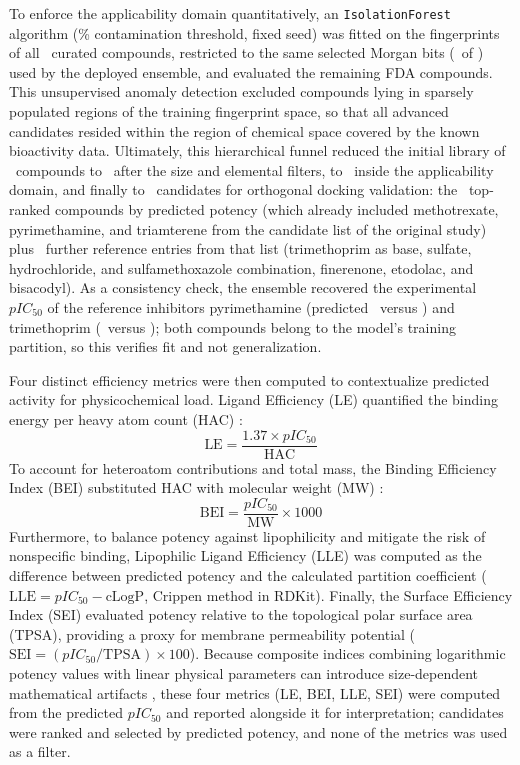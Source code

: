 To enforce the applicability domain quantitatively, an \texttt{IsolationForest} algorithm (\ScreenIsoContamination\% contamination threshold, fixed seed) was fitted on the fingerprints of all \ScreenNTrainMols\ curated compounds, restricted to the same selected Morgan bits (\ExpBNFeaturesSelected\ of \ExpBNFeaturesTotal) used by the deployed ensemble, and evaluated the remaining FDA compounds. This unsupervised anomaly detection excluded compounds lying in sparsely populated regions of the training fingerprint space, so that all advanced candidates resided within the region of chemical space covered by the known bioactivity data. Ultimately, this hierarchical funnel reduced the initial library of \ScreenNLibrary\ compounds to \ScreenNStructural\ after the size and elemental filters, to \ScreenNDomain\ inside the applicability domain, and finally to \ScreenNCandidates\ candidates for orthogonal docking validation: the \ScreenNTopML\ top-ranked compounds by predicted potency (which already included methotrexate, pyrimethamine, and triamterene from the candidate list of the original study) plus \ScreenNReference\ further reference entries from that list (trimethoprim as base, sulfate, hydrochloride, and sulfamethoxazole combination, finerenone, etodolac, and bisacodyl). As a consistency check, the ensemble recovered the experimental $pIC_{50}$ of the reference inhibitors pyrimethamine (predicted \ControlPyrimethaminePred\ versus \ControlPyrimethamineExp) and trimethoprim (\ControlTrimethoprimPred\ versus \ControlTrimethoprimExp); both compounds belong to the model's training partition, so this verifies fit and not generalization.

Four distinct efficiency metrics were then computed to contextualize predicted activity for physicochemical load. Ligand Efficiency (LE) quantified the binding energy per heavy atom count (HAC) \cite{hopkins2014}:
\begin{equation}
	\text{LE} = \frac{1.37 \times pIC_{50}}{\text{HAC}}
\end{equation}
To account for heteroatom contributions and total mass, the Binding Efficiency Index (BEI) substituted HAC with molecular weight (MW) \cite{abad2005}:
\begin{equation}
	\text{BEI} = \frac{pIC_{50}}{\text{MW}} \times 1000
\end{equation}
Furthermore, to balance potency against lipophilicity and mitigate the risk of nonspecific binding, Lipophilic Ligand Efficiency (LLE) was computed as the difference between predicted potency and the calculated partition coefficient ($\text{LLE} = pIC_{50} - \text{cLogP}$, Crippen method in RDKit). Finally, the Surface Efficiency Index (SEI) evaluated potency relative to the topological polar surface area (TPSA), providing a proxy for membrane permeability potential ($\text{SEI} = (pIC_{50} / \text{TPSA}) \times 100$). Because composite indices combining logarithmic potency values with linear physical parameters can introduce size-dependent mathematical artifacts \cite{shultz2013}, these four metrics (LE, BEI, LLE, SEI) were computed from the predicted $pIC_{50}$ and reported alongside it for interpretation; candidates were ranked and selected by predicted potency, and none of the metrics was used as a filter.

